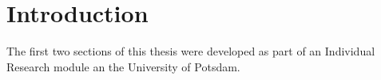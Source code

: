 \section{Introduction   }
\label{sec:introduction}

The first two sections of this thesis were developed as part of an Individual Research module an the University of Potsdam.